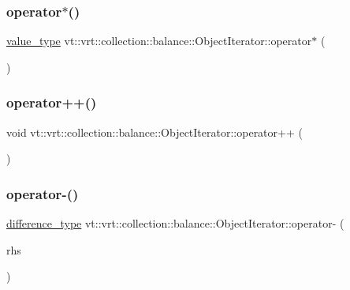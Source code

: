 \subsubsection{\texorpdfstring{operator$\ast$()}{operator*()}}
{\footnotesize\ttfamily \hyperlink{classvt_1_1vrt_1_1collection_1_1balance_1_1_object_iterator_aae1089959ea6df7ad5a69e3c07eaa338}{value\+\_\+type} vt\+::vrt\+::collection\+::balance\+::\+Object\+Iterator\+::operator$\ast$ (\begin{DoxyParamCaption}{ }\end{DoxyParamCaption})\hspace{0.3cm}{\ttfamily [inline]}}

\mbox{\label{classvt_1_1vrt_1_1collection_1_1balance_1_1_object_iterator_a22189471c74df1c8c1a29edf6f659244}} 
\subsubsection{\texorpdfstring{operator++()}{operator++()}}
{\footnotesize\ttfamily void vt\+::vrt\+::collection\+::balance\+::\+Object\+Iterator\+::operator++ (\begin{DoxyParamCaption}{ }\end{DoxyParamCaption})\hspace{0.3cm}{\ttfamily [inline]}}

\mbox{\label{classvt_1_1vrt_1_1collection_1_1balance_1_1_object_iterator_ae958537b0e132b982d0e360a54ea1f89}} 
\subsubsection{\texorpdfstring{operator-\/()}{operator-()}}
{\footnotesize\ttfamily \hyperlink{classvt_1_1vrt_1_1collection_1_1balance_1_1_object_iterator_a97e592ab92b9cdf3156c10aacad7723c}{difference\+\_\+type} vt\+::vrt\+::collection\+::balance\+::\+Object\+Iterator\+::operator-\/ (\begin{DoxyParamCaption}\item[{\hyperlink{classvt_1_1vrt_1_1collection_1_1balance_1_1_object_iterator}{Object\+Iterator}}]{rhs }\end{DoxyParamCaption})\hspace{0.3cm}{\ttfamily [inline]}}



